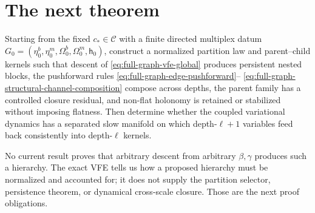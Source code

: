 \section{The next theorem}
\label{sec:full-graph-vfe-target}

Starting from the fixed $c_*\in\mathcal C$ with a finite directed multiplex
datum $G_0=(\eta_0^b,\eta_0^m,\Omega_0^b,\Omega_0^m,\mathsf h_0)$, construct a
normalized partition law and parent--child kernels such that descent of
\eqref{eq:full-graph-vfe-global} produces persistent nested blocks, the
pushforward rules \eqref{eq:full-graph-edge-pushforward}--
\eqref{eq:full-graph-structural-channel-composition} compose across depths,
the parent family has a controlled closure residual, and non-flat holonomy is
retained or stabilized without imposing flatness. Then determine whether the
coupled variational dynamics has a separated slow manifold on which
depth-$\ell+1$ variables feed back consistently into depth-$\ell$ kernels.

No current result proves that arbitrary descent from arbitrary
$\beta,\gamma$ produces such a hierarchy. The exact VFE tells us how a
proposed hierarchy must be normalized and accounted for; it does not supply
the partition selector, persistence theorem, or dynamical cross-scale
closure. Those are the next proof obligations. 
